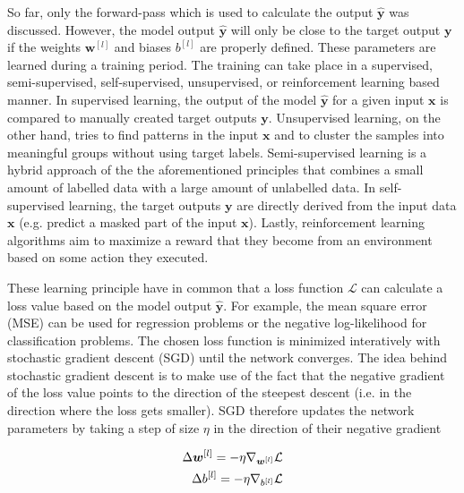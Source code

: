 So far, only the forward-pass which is used to calculate the output \(\boldsymbol{\hat{y}}\) was discussed.
However, the model output \(\boldsymbol{\hat{y}}\) will only be close to the target output \(\boldsymbol{y}\) if the weights \(\boldsymbol{w}^{[l]}\) and biases \(b^{[l]}\) are properly defined.
These parameters are learned during a training period.
The training can take place in a supervised, semi-supervised, self-supervised, unsupervised, or reinforcement learning based manner.
In supervised learning, the output of the model \(\boldsymbol{\hat{y}}\) for a given input \(\boldsymbol{x}\) is compared to manually created target outputs \(\boldsymbol{y}\).
Unsupervised learning, on the other hand, tries to find patterns in the input \(\boldsymbol{x}\) and to cluster the samples into meaningful groups without using target labels.
Semi-supervised learning is a hybrid approach of the the aforementioned principles that combines a small amount of labelled data with a large amount of unlabelled data.
In self-supervised learning, the target outputs \(\boldsymbol{y}\) are directly derived from the input data \(\boldsymbol{x}\) (e.g. predict a masked part of the input \(\boldsymbol{x}\)).
Lastly, reinforcement learning algorithms aim to maximize a reward that they become from an environment based on some action they executed.

These learning principle have in common that a loss function \(\mathcal{L}\) can calculate a loss value based on the model output \(\boldsymbol{\hat{y}}\). 
For example, the mean square error (MSE) can be used for regression problems or the negative log-likelihood for classification problems.
The chosen loss function is minimized interatively with stochastic gradient descent (SGD) until the network converges.
The idea behind stochastic gradient descent is to make use of the fact that the negative gradient of the loss value points to the direction of the steepest descent (i.e. in the direction where the loss gets smaller).
SGD therefore updates the network parameters by taking a step of size \(\eta\) in the direction of their negative gradient

\begin{equation}\eqlbl{sgd}
	\begin{aligned}
		\Delta \boldsymbol{w}^{[l]} = -\eta \nabla_{\boldsymbol{w}^{[l]}} \mathcal{L}\\
		\Delta b^{[l]} = -\eta \nabla_{b^{[l]}} \mathcal{L}
	\end{aligned}
\end{equation}

